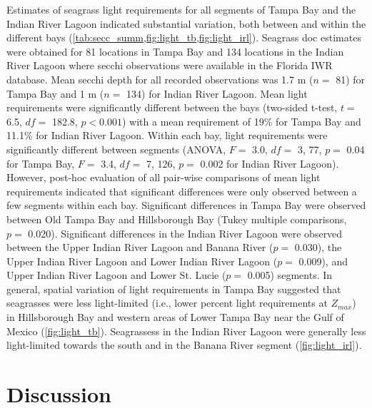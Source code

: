 \documentclass[letterpaper,12pt,oneside]{article}\usepackage[]{graphicx}\usepackage[]{color}
\begin{document}
Estimates of seagrass light requirements for all segments of Tampa Bay and the Indian River Lagoon indicated substantial variation, both between and within the different bays (\cref{tab:secc_summ,fig:light_tb,fig:light_irl}).  Seagrass \ac{doc} estimates were obtained for 81 locations in Tampa Bay and 134 locations in the Indian River Lagoon where secchi observations were available in the Florida \ac{IWR} database.  Mean secchi depth for all recorded observations was 1.7 m ($n=$ 81) for Tampa Bay and 1 m ($n=$ 134) for Indian River Lagoon.  Mean light requirements were significantly different between the bays (two-sided t-test, $t=$ 6.5, $df=$ 182.8, $p < 0.001$) with a mean requirement of 19\% for Tampa Bay and 11.1\% for Indian River Lagoon.  Within each bay, light requirements were significantly different between segments (ANOVA, $F =$ 3.0, $df =$ 3, 77, $p = $ 0.04 for Tampa Bay, $F =$ 3.4, $df =$ 7, 126, $p = $ 0.002 for Indian River Lagoon).  However, post-hoc evaluation of all pair-wise comparisons of mean light requirements indicated that significant differences were only observed between a few segments within each bay.  Significant differences in Tampa Bay were observed between Old Tampa Bay and Hillsborough Bay (Tukey multiple comparisons, $p =$ 0.020).  Significant differences in the Indian River Lagoon were observed between the Upper Indian River Lagoon and Banana River ($p =$ 0.030), the Upper Indian River Lagoon and Lower Indian River Lagoon ($p =$ 0.009), and Upper Indian River Lagoon and Lower St. Lucie ($p =$ 0.005) segments.  In general, spatial variation of light requirements in Tampa Bay suggested that seagrasses were less light-limited (i.e., lower percent light requirements at $Z_{max}$) in Hillsborough Bay and western areas of Lower Tampa Bay near the Gulf of Mexico (\cref{fig:light_tb}).  Seagrassess in the Indian River Lagoon were generally less light-limited towards the south and in the Banana River segment (\cref{fig:light_irl}).

\section{Discussion}



\end{document}
